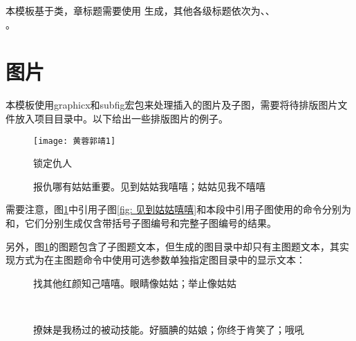 \documentclass[print, doctor, vlined]{DissertUESTC}
\begin{document}
	本模板基于类，章标题需要使用 生成，其他各级标题依次为、、\\ 。
	
	\section{图片}
	
	本模板使用graphicx和subfig宏包来处理插入的图片及子图，需要将待排版图片文件放入项目目录中。以下给出一些排版图片的例子。
	
	\begin{figure}[!htb]
		\centering
		\texttt{[image: 黄蓉郭靖1]}
		\caption{锁定仇人}
	\end{figure}
	
	\clearpage
	\begin{figure}[!htb]
		\centering
		\hfill
		\caption[报仇哪有姑姑重要]{报仇哪有姑姑重要。见到姑姑我嘻嘻；姑姑见我不嘻嘻} \label{fig: 报仇哪有姑姑重要}
	\end{figure}
	

	需要注意，图\ref{fig: 报仇哪有姑姑重要}中引用子图\ref{fig: 见到姑姑嘻嘻}和本段中引用子图使用的命令分别为和，它们分别生成仅含带括号子图编号和完整子图编号的结果。
	
	另外，图\ref{fig: 报仇哪有姑姑重要}的图题包含了子图题文本，但生成的图目录中却只有主图题文本，其实现方式为在主图题命令中使用可选参数单独指定图目录中的显示文本：
	
	\begin{figure}[!htb]
		\centering
		\hfill
		\subfloat[]{
			\texttt{[image: 程英3]}
			\label{fig: 程英3}
		}
		\caption{找其他红颜知己嘻嘻。眼睛像姑姑；举止像姑姑} \label{fig: 红颜知己}
	\end{figure}
	
	\begin{figure}[!htb]
		\centering
		\subfloat[]{
			\texttt{[image: 绿萼2]}
			\label{fig: 绿萼2}
		}
		\hfill
		\\
		\caption{撩妹是我杨过的被动技能。好腼腆的姑娘；你终于肯笑了；哦吼} \label{fig: 被动技能}
	\end{figure}
\end{document}
